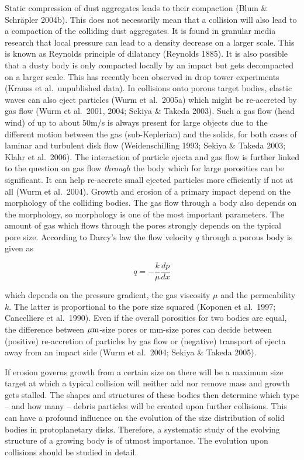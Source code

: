 Static compression of dust aggregates leads to their compaction (Blum \&
Schr\"apler 2004b).  This does not necessarily mean that a collision will
also lead to a compaction of the colliding dust aggregates. It is found in
granular media research that local pressure can lead to a density decrease
on a larger scale. This is known as Reynolds principle of dilatancy
(Reynolds 1885).  It is also possible that a dusty body is only compacted
locally by an impact but gets decompacted on a larger scale. This has
recently been observed in drop tower experiments (Krauss et al.\ unpublished
data). In collisions onto porous target bodies, elastic waves can also eject
particles (Wurm et al.~2005a) which might be re-accreted by gas flow (Wurm et
al.~2001, 2004; Sekiya \& Takeda 2003). Such a gas flow (head wind) of up to
about 50m/s is always present for large objects due to the different motion
between the gas (sub-Keplerian) and the solids, for both cases of laminar
and turbulent disk flow (Weidenschilling 1993; Sekiya \& Takeda 2003;
Klahr et al.~2006).  The interaction of particle ejecta and gas flow is
further linked to the question on gas flow {\it through} the body which for
large porosities can be significant. It can help re-accrete small ejected
particles more efficiently if not at all (Wurm et al.~2004).  Growth and
erosion of a primary impact depend on the morphology of the colliding
bodies.  The gas flow through a body also depends on the morphology, so
morphology is one of the most important parameters. The amount of gas which
flows through the pores strongly depends on the typical pore size.
According to Darcy's law the flow velocity $q$ through a porous body is
given as

\begin{equation}
q=-\frac{k}{\mu} \frac{dp}{dx}
\end{equation}

\noindent which depends on the pressure gradient, the gas viscosity $\mu$
and the permeability $k$. The latter is proportional to the pore size
squared (Koponen et al.~1997; Cancelliere et al.~1990). Even if the
overall porosities for two bodies are equal, the difference between $\rm \mu
m$-size pores or mm-size pores can decide between (positive) re-accretion of
particles by gas flow or (negative) transport of ejecta away from an impact
side (Wurm et al.~2004; Sekiya \& Takeda 2005).

If erosion governs growth from a certain size on there will be a maximum
size target at which a typical collision will neither add nor remove mass
and growth gets stalled. The shapes and structures of these bodies then
determine which type -- and how many -- debris particles will be created
upon further collisions. This can have a profound influence on the evolution
of the size distribution of solid bodies in protoplanetary disks.
Therefore, a systematic study of the evolving structure of a growing body is
of utmost importance. The evolution upon collisions should be studied in
detail.

